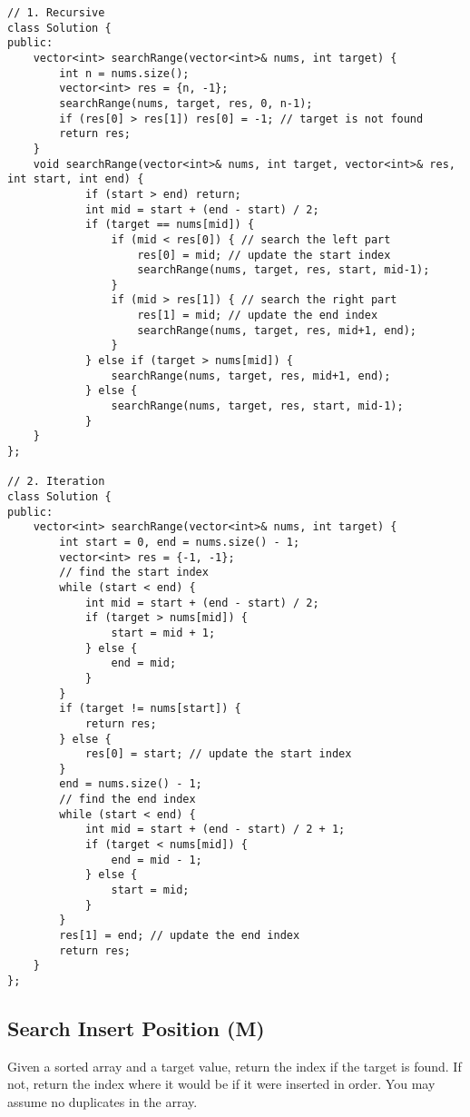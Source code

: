 \begin{lstlisting}
// 1. Recursive
class Solution {
public:
    vector<int> searchRange(vector<int>& nums, int target) {
        int n = nums.size();
        vector<int> res = {n, -1};
        searchRange(nums, target, res, 0, n-1);
        if (res[0] > res[1]) res[0] = -1; // target is not found
        return res;
    }
    void searchRange(vector<int>& nums, int target, vector<int>& res, int start, int end) {
            if (start > end) return;
            int mid = start + (end - start) / 2;
            if (target == nums[mid]) {
                if (mid < res[0]) { // search the left part
                    res[0] = mid; // update the start index
                    searchRange(nums, target, res, start, mid-1);
                }
                if (mid > res[1]) { // search the right part
                    res[1] = mid; // update the end index
                    searchRange(nums, target, res, mid+1, end);
                }
            } else if (target > nums[mid]) { 
                searchRange(nums, target, res, mid+1, end);
            } else {
                searchRange(nums, target, res, start, mid-1);
            }
    }
};

// 2. Iteration
class Solution {
public:
    vector<int> searchRange(vector<int>& nums, int target) {
        int start = 0, end = nums.size() - 1;
        vector<int> res = {-1, -1};
        // find the start index
        while (start < end) {
            int mid = start + (end - start) / 2;
            if (target > nums[mid]) {
                start = mid + 1;
            } else {
                end = mid;
            }
        }
        if (target != nums[start]) {
            return res;
        } else {
            res[0] = start; // update the start index
        }
        end = nums.size() - 1;
        // find the end index
        while (start < end) {
            int mid = start + (end - start) / 2 + 1;
            if (target < nums[mid]) {
                end = mid - 1;
            } else {
                start = mid;
            }
        }
        res[1] = end; // update the end index
        return res;
    }
};
\end{lstlisting}


\subsection{Search Insert Position (M)}
Given a sorted array and a target value, return the index if the target is found. If not, return the index where it would be if it were inserted in order. 
You may assume no duplicates in the array.\\

